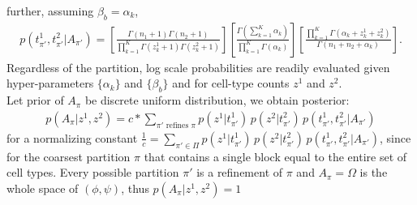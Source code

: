 \documentclass[11pt]{amsart}
\begin{document}
further, assuming $\beta_b = \alpha_k$,
\begin{eqnarray*}
p(t^1_{\pi'},t^2_{\pi'}| A_{\pi'}) =
 \left[ \frac{ \Gamma(n_1+1) \Gamma(n_2+1) }{ \prod_{k=1}^K 
   \Gamma(z^1_k+1) 
   \Gamma( z^2_k + 1 )} \right] 
\left[ \frac{\Gamma( \sum_{k=1}^K \alpha_k  )}{
   \prod_{k=1}^K \Gamma(\alpha_k )} \right] 
 \left[ \frac{ \prod_{k=1}^K \Gamma( \alpha_k + z^1_k + z^2_k )}{
	\Gamma( n_1 + n_2 + \alpha_k  )} \right].
\end{eqnarray*}
\cite{ref:bayesC}
Regardless of the partition,
log scale probabilities are readily evaluated 
given hyper-parameters $\{ \alpha_k \}$ and $\{ \beta_b \}$ and for
cell-type counts $z^1$ and $z^2$. \\
Let prior of $A_\pi$ be discrete uniform distribution, we obtain posterior:
\begin{align}
p(A_\pi | z^1, z^2) = c*\sum_{\pi' \text{ refines } \pi} p(z^1 | t^1_{\pi'})\, p(z^2|  t^2_{\pi'} )
 \, p( t^1_{\pi'}, t^2_{\pi'} | A_{\pi'} )
\end{align}
for a normalizing constant $\frac{1}{c} = \underset{\pi' \in \Pi}\sum p(z^1 | t^1_{\pi'})\, p(z^2|  t^2_{\pi'} )
 \, p( t^1_{\pi'}, t^2_{\pi'} | A_{\pi'} )$, since for the coarsest partition $\pi$ that contains a single block equal to the entire
 set of cell types. Every possible partition $\pi'$ is a refinement of $\pi$ and $A_\pi = \Omega$ is the whole space of $(\phi,\psi)$, thus $p(A_\pi | z^1, z^2) = 1$
\\
\end{document}
